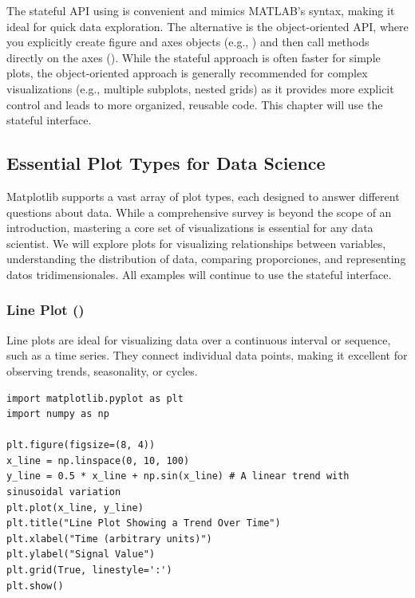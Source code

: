 \begin{remark}
The stateful API using  is convenient and mimics MATLAB's syntax, making it ideal for quick data exploration. The alternative is the object-oriented API, where you explicitly create figure and axes objects (e.g., ) and then call methods directly on the axes (). While the stateful approach is often faster for simple plots, the object-oriented approach is generally recommended for complex visualizations (e.g., multiple subplots, nested grids) as it provides more explicit control and leads to more organized, reusable code. This chapter will use the stateful  interface.
\end{remark}

\subsection{Essential Plot Types for Data Science}
\label{subsec:plot_types}
Matplotlib supports a vast array of plot types, each designed to answer different questions about data. While a comprehensive survey is beyond the scope of an introduction, mastering a core set of visualizations is essential for any data scientist. We will explore plots for visualizing relationships between variables, understanding the distribution of data, comparing proporciones, and representing datos tridimensionales. All examples will continue to use the stateful  interface.

\subsubsection*{Line Plot ()}
Line plots are ideal for visualizing data over a continuous interval or sequence, such as a time series. They connect individual data points, making it excellent for observing trends, seasonality, or cycles.

\begin{example}
\text{ }\begin{verbatim}
import matplotlib.pyplot as plt
import numpy as np

plt.figure(figsize=(8, 4))
x_line = np.linspace(0, 10, 100)
y_line = 0.5 * x_line + np.sin(x_line) # A linear trend with sinusoidal variation
plt.plot(x_line, y_line)
plt.title("Line Plot Showing a Trend Over Time")
plt.xlabel("Time (arbitrary units)")
plt.ylabel("Signal Value")
plt.grid(True, linestyle=':')
plt.show()
\end{verbatim}
\end{example}

